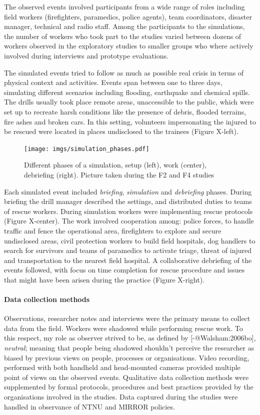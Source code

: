The observed events involved participants from a wide range of roles
including field workers (firefighters, paramedics, police agents), team
coordinators, disaster manager, technical and radio staff. Among the
participants to the simulations, the number of workers who took part to
the studies varied between dozens of workers observed in the exploratory
studies to smaller groups who where actively involved during interviews
and prototype evaluations.

The simulated events tried to follow as much as possible real crisis in
terms of physical context and activities. Events span between one to
three days, simulating different scenarios including flooding,
earthquake and chemical spills. The drills usually took place remote
areas, unaccessible to the public, which were set up to recreate harsh
conditions like the presence of debris, flooded terrains, fire ashes and
broken cars. In this setting, volunteers impersonating the injured to be
rescued were located in places undisclosed to the trainees (Figure
X-left).

\begin{figure}[htbp]
\centering
\texttt{[image: imgs/simulation\_phases.pdf]}
\caption{Different phases of a simulation, setup (left), work (center),
debriefing (right). Picture taken during the F2 and F4 studies}
\end{figure}

Each simulated event included \emph{briefing}, \emph{simulation} and
\emph{debriefing} phases. During briefing the drill manager described
the settings, and distributed duties to teams of rescue workers. During
simulation workers were implementing rescue protocols (Figure X-center).
The work involved cooperation among: police forces, to handle traffic
and fence the operational area, firefighters to explore and secure
undisclosed areas, civil protection workers to build field hospitals,
dog handlers to search for survivors and teams of paramedics to activate
triage, threat of injured and transportation to the nearest field
hospital. A collaborative debriefing of the events followed, with focus
on time completion for rescue procedure and issues that might have been
arisen during the practice (Figure X-right).

\paragraph{Data collection methods}\label{data-collection-methods}

Observations, researcher notes and interviews were the primary means to
collect data from the field. Workers were shadowed while performing
rescue work. To this respect, my role as observer strived to be, as
defined by {[}-@Walsham:2006bo{]}, \emph{neutral}; meaning that people
being shadowed shouldn't perceive the researcher as biased by previous
views on people, processes or organisations. Video recording, performed
with both handheld and head-mounted cameras provided multiple point of
views on the observed events. Qualitative data collection methods were
supplemented by formal protocols, procedures and best practices provided
by the organisations involved in the studies. Data captured during the
studies were handled in observance of NTNU and MIRROR policies.

